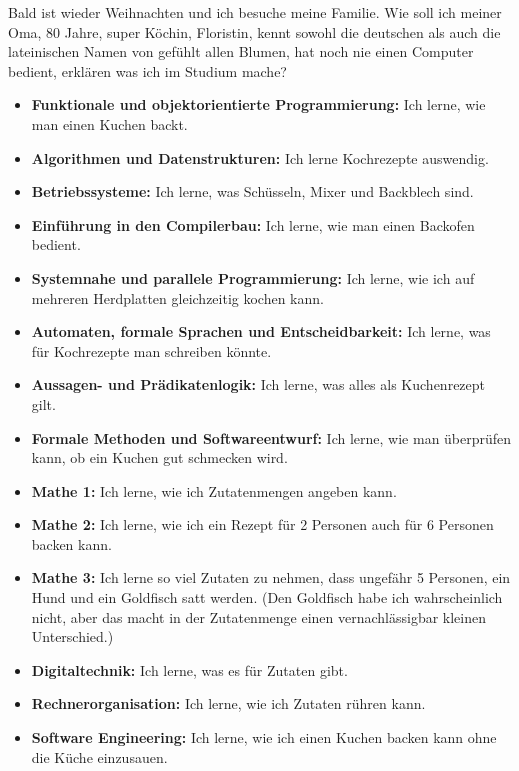 {Bald ist wieder Weihnachten und ich besuche meine Familie. Wie soll ich
    meiner Oma, 80 Jahre, super Köchin, Floristin, kennt sowohl die
    deutschen als auch die lateinischen Namen von gefühlt allen Blumen, hat
    noch nie einen Computer bedient, erklären was ich im Studium mache?
}
{

    \begin{itemize}
        \item \textbf{Funktionale und objektorientierte Programmierung:} Ich
            lerne, wie man einen Kuchen backt.
        \item \textbf{Algorithmen und Datenstrukturen:} Ich lerne Kochrezepte
            auswendig.
        \item \textbf{Betriebssysteme:} Ich lerne, was Schüsseln, Mixer und
            Backblech sind.
        \item \textbf{Einführung in den Compilerbau:} Ich lerne, wie man einen
            Backofen bedient.
        \item \textbf{Systemnahe und parallele Programmierung:} Ich lerne, wie
            ich auf mehreren Herdplatten gleichzeitig kochen kann.
        \item \textbf{Automaten, formale Sprachen und Entscheidbarkeit:} Ich
            lerne, was für Kochrezepte man schreiben könnte.
        \item \textbf{Aussagen- und Prädikatenlogik:} Ich lerne, was alles als
            Kuchenrezept gilt.
        \item \textbf{Formale Methoden und Softwareentwurf:} Ich lerne, wie man
            überprüfen kann, ob ein Kuchen gut schmecken wird.
        \item \textbf{Mathe 1:} Ich lerne, wie ich Zutatenmengen angeben kann.
        \item \textbf{Mathe 2:} Ich lerne, wie ich ein Rezept für 2 Personen auch
            für 6 Personen backen kann.
        \item \textbf{Mathe 3:} Ich lerne so viel Zutaten zu nehmen, dass
            ungefähr 5 Personen, ein Hund und ein Goldfisch satt werden. (Den
            Goldfisch habe ich wahrscheinlich nicht, aber das macht in der
            Zutatenmenge einen vernachlässigbar kleinen Unterschied.)
        \item \textbf{Digitaltechnik:} Ich lerne, was es für Zutaten gibt.
        \item \textbf{Rechnerorganisation:} Ich lerne, wie ich Zutaten rühren kann.
        \item \textbf{Software Engineering:} Ich lerne, wie ich einen Kuchen backen kann ohne die Küche einzusauen.

\end{itemize}}
